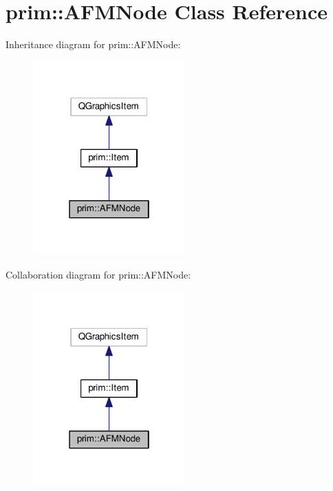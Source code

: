 \hypertarget{classprim_1_1AFMNode}{}\section{prim\+:\+:A\+F\+M\+Node Class Reference}
\label{classprim_1_1AFMNode}


Inheritance diagram for prim\+:\+:A\+F\+M\+Node\+:\nopagebreak
\begin{figure}[H]
\begin{center}
\leavevmode
\includegraphics[width=166pt]{classprim_1_1AFMNode__inherit__graph}
\end{center}
\end{figure}


Collaboration diagram for prim\+:\+:A\+F\+M\+Node\+:\nopagebreak
\begin{figure}[H]
\begin{center}
\leavevmode
\includegraphics[width=166pt]{classprim_1_1AFMNode__coll__graph}
\end{center}
\end{figure}
